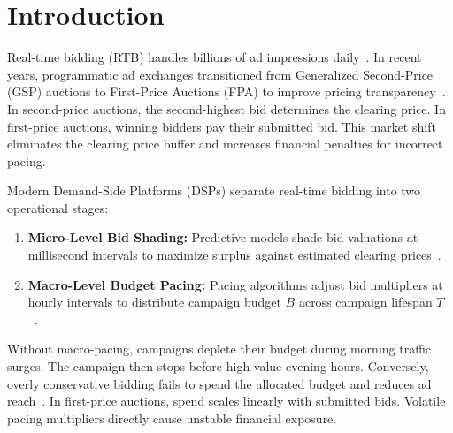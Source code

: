 \documentclass[sigconf]{acmart}
\begin{document}


\maketitle

\section{Introduction}
Real-time bidding (RTB) handles billions of ad impressions daily~\cite{zhang2014real}. In recent years, programmatic ad exchanges transitioned from Generalized Second-Price (GSP) auctions to First-Price Auctions (FPA) to improve pricing transparency~\cite{despotakis2021first,zhou2021bid}. In second-price auctions, the second-highest bid determines the clearing price. In first-price auctions, winning bidders pay their submitted bid. This market shift eliminates the clearing price buffer and increases financial penalties for incorrect pacing.

Modern Demand-Side Platforms (DSPs) separate real-time bidding into two operational stages:
\begin{enumerate}
    \item \textbf{Micro-Level Bid Shading:} Predictive models shade bid valuations at millisecond intervals to maximize surplus against estimated clearing prices~\cite{zhou2021bid,balseiro2021budget}.
    \item \textbf{Macro-Level Budget Pacing:} Pacing algorithms adjust bid multipliers at hourly intervals to distribute campaign budget $B$ across campaign lifespan $T$~\cite{xu2015smart,grigas2017profit}.
\end{enumerate}
Without macro-pacing, campaigns deplete their budget during morning traffic surges. The campaign then stops before high-value evening hours. Conversely, overly conservative bidding fails to spend the allocated budget and reduces ad reach~\cite{bhalgat2012online}. In first-price auctions, spend scales linearly with submitted bids. Volatile pacing multipliers directly cause unstable financial exposure.
\end{document}
